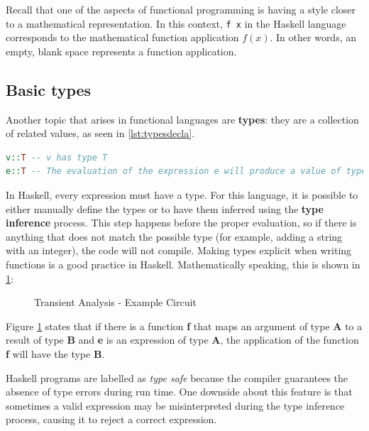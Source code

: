 Recall that one of the aspects of functional programming is having a style closer to a mathematical representation. In this context, \lstinline[language=haskell]{f x} in the Haskell language corresponds to the mathematical function application $ f(x) $. In other words, an empty, blank space represents a function application.

\subsection{Basic types}

Another topic that arises in functional languages are \textbf{types}: they are a collection of related values, as seen in \cref{lst:typesdecla}.

\begin{lstlisting}[language=Haskell, label={lst:typesdecla}, caption={Types for variables and expressions}, captionpos=b]
v::T -- v has type T
e::T -- The evaluation of the expression e will produce a value of type T
\end{lstlisting}

In Haskell, every expression must have a type. For this language, it is possible to either manually define the types or to have them inferred using the \textbf{type inference} process. This step happens before the proper evaluation, so if there is anything that does not match the possible type (for example, adding a string with an integer), the code will not compile. Making types explicit when writing functions is a good practice in Haskell. Mathematically speaking, this is shown in \cref{fig:proof1}:

\begin{figure}[H]
\caption{Transient Analysis - Example Circuit}
\label{fig:proof1}
\begin{prooftree}
\end{prooftree}
\end{figure}

Figure \ref{fig:proof1} states that if there is a function \textbf{f} that maps an argument of type \textbf{A} to a result of type \textbf{B} and \textbf{e} is an expression of type \textbf{A}, the application of the function \textbf{f} will have the type \textbf{B}.

Haskell programs are labelled as \textit{type safe} because the compiler guarantees the absence of type errors during run time. One downside about this feature is that sometimes a valid expression may be misinterpreted during the type inference process, causing it to reject a correct expression.

